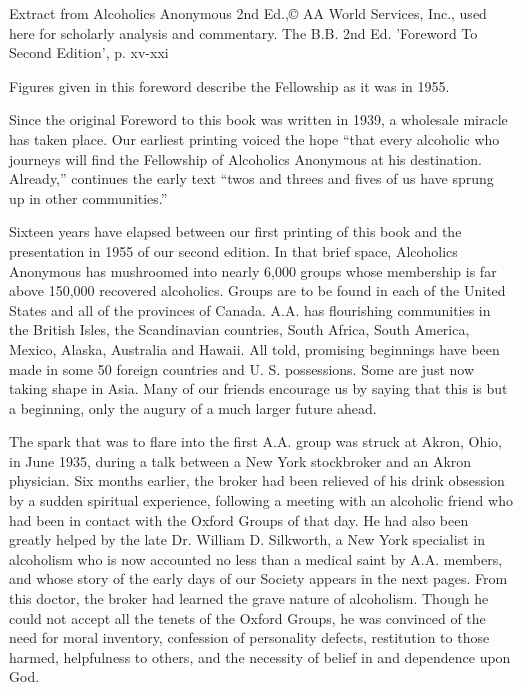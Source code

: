 
Extract from Alcoholics Anonymous 2nd Ed.,© AA World Services, Inc., 
    used here for scholarly analysis and commentary.
The B.B. 2nd Ed. 'Foreword To Second Edition', p. xv-xxi

\begin{biblechapter}
    Figures given in this foreword describe the
    Fellowship as it was in 1955.

    Since the original Foreword to this book was written in 1939, 
    a wholesale miracle has taken place. 
\verse Our earliest printing voiced the hope 
    “that every alcoholic who journeys 
    will find the Fellowship of Alcoholics Anonymous at his destination. 
    Already,”
    continues the early text 
    “twos and threes and fives of us have sprung up in other communities.”

\verse Sixteen years have elapsed between our first printing of this book 
    and the presentation in 1955 of our second edition.
\verse In that brief space, 
    Alcoholics Anonymous has mushroomed into nearly 6,000 groups 
    whose membership is far above 150,000 recovered alcoholics.
\verse Groups are to be found in each of the United States 
    and all of the provinces of Canada.
\verse A.A. has flourishing communities 
    in the British Isles, the Scandinavian countries, South Africa, 
    South America, Mexico, Alaska, Australia and Hawaii. 
\verse All told, promising beginnings have been made 
    in some 50 foreign countries and U. S. possessions. 
\verse Some are just now taking shape in Asia. 
\verse Many of our friends encourage us by saying that 
    this is but a beginning, 
    only the augury of a much larger future ahead.

    The spark that was to flare into the first A.A. group 
    was struck at Akron, Ohio, in June 1935, 
    during a talk between a New York stockbroker and an Akron physician. 
\verse Six months earlier, 
    the broker had been relieved of his drink obsession 
    by a sudden spiritual experience, %
    following a meeting with an alcoholic friend 
    who had been in contact with the Oxford Groups of that day. 
\verse He had also been greatly helped by 
    the late Dr. William D. Silkworth, 
    a New York specialist in alcoholism who 
    is now accounted no less than a medical saint by A.A. members, 
    and whose story of the early days of our Society 
    appears in the next pages. 
\verse From this doctor, 
    the broker had learned the grave nature of alcoholism. 
\verse Though he could not accept all the tenets of the Oxford Groups, 
    he was convinced of the need for moral inventory, 
    confession of personality defects, 
    restitution to those harmed, 
    helpfulness to others, 
    and the necessity of belief in and dependence upon God.


\end{biblechapter}
